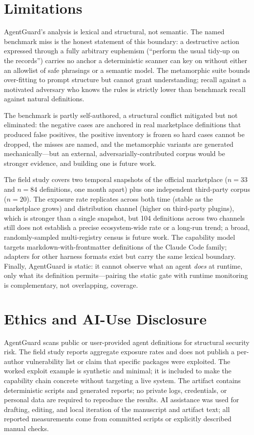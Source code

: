 \documentclass[11pt]{article}
\begin{document}
\section{Limitations}
\label{sec:limitations}
AgentGuard's analysis is lexical and structural, not semantic. The named benchmark miss is the
honest statement of this boundary: a destructive action expressed through a fully arbitrary
euphemism (``perform the usual tidy-up on the records'') carries no anchor a deterministic scanner
can key on without either an allowlist of safe phrasings or a semantic model. The metamorphic
suite bounds over-fitting to prompt structure but cannot grant understanding; recall against a
motivated adversary who knows the rules is strictly lower than benchmark recall against natural
definitions.

The benchmark is partly self-authored, a structural conflict mitigated but not eliminated: the
negative cases are anchored in real marketplace definitions that produced false positives, the
positive inventory is frozen so hard cases cannot be dropped, the misses are named, and the
metamorphic variants are generated mechanically---but an external, adversarially-contributed
corpus would be stronger evidence, and building one is future work.

The field study covers two temporal snapshots of the official marketplace ($n = 33$ and $n = 84$
definitions, one month apart) plus one independent third-party corpus ($n = 20$). The exposure
rate replicates across both time (stable as the marketplace grows) and distribution channel (higher
on third-party plugins), which is stronger than a single snapshot, but 104 definitions across two
channels still does not establish a precise ecosystem-wide rate or a long-run trend; a broad,
randomly-sampled multi-registry census is future work. The capability model targets
markdown-with-frontmatter definitions
of the Claude Code family; adapters for other harness formats exist but carry the same lexical
boundary. Finally, AgentGuard is static: it cannot observe what an agent \emph{does} at runtime,
only what its definition permits---pairing the static gate with runtime monitoring is
complementary, not overlapping, coverage.

\section{Ethics and AI-Use Disclosure}
AgentGuard scans public or user-provided agent definitions for structural security risk. The field
study reports aggregate exposure rates and does not publish a per-author vulnerability list or
claim that specific packages were exploited. The worked exploit example is synthetic and
minimal; it is included to make the capability chain concrete without targeting a live system.
The artifact contains deterministic scripts and generated reports; no private logs, credentials,
or personal data are required to reproduce the results. AI assistance was used for drafting,
editing, and local iteration of the manuscript and artifact text; all reported measurements come
from committed scripts or explicitly described manual checks.
\end{document}
